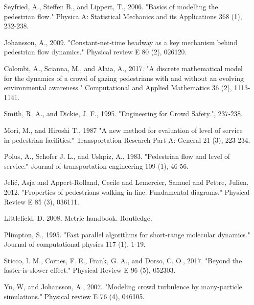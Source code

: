 \documentclass[preprint,12pt]{elsarticle}
\begin{document}
\begin{thebibliography}{10}
Seyfried, A., Steffen B., and Lippert, T., 2006. "Basics of modelling the 
pedestrian flow." Physica A: Statistical Mechanics and its Applications 368 
(1), 232-238.
{}

Johansson, A., 2009. "Constant-net-time headway as a key mechanism behind 
pedestrian flow dynamics." Physical review E 80 (2), 026120. 
{}

Colombi, A., Scianna, M., and Alaia, A., 2017. "A discrete 
mathematical model for the dynamics of a crowd of gazing pedestrians with and 
without an evolving environmental awareness." Computational and Applied 
Mathematics 36 (2), 1113-1141.
{}

Smith, R. A., and Dickie, J. F., 1995. "Engineering for Crowd Safety.", 237-238.

Mori, M., and Hiroshi T., 1987 "A new method for evaluation of level of 
service in pedestrian facilities." Transportation Research Part A: General 
21 (3), 223-234.
{}

Polus, A., Schofer J. L., and Ushpiz, A., 1983. "Pedestrian flow and level 
of service." Journal of transportation engineering 109 (1), 46-56.
{}

Jeli\'c, Asja and Appert-Rolland, Cecile and Lemercier, Samuel and Pettre, 
Julien, 2012. "Properties of pedestrians walking in line: Fundamental 
diagrams." Physical Review E 85 (3), 036111.
{}

Littlefield, D. 2008. Metric handbook. Routledge.
{}


Plimpton, S., 1995. "Fast parallel algorithms for short-range molecular 
dynamics." Journal of computational physics 117 (1), 1-19.
{}

Sticco, I. M., Cornes, F. E., Frank, G. A., and Dorso, C. O., 2017. "Beyond the 
faster-is-slower effect." Physical Review E 96 (5), 052303.
{}

Yu, W, and Johansson, A., 2007. "Modeling crowd turbulence by many-particle 
simulations." Physical review E 76 (4), 046105.
{}


\end{thebibliography}
\end{document}
